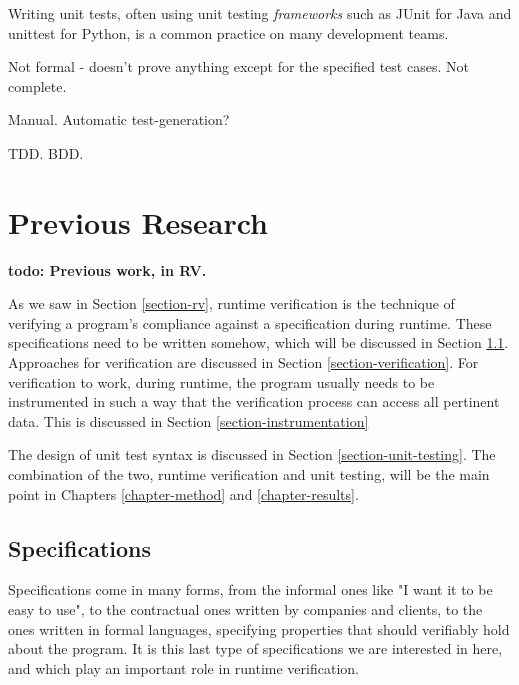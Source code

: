 \documentclass[a4paper,11pt]{kth-mag}
\newcommand{\todo}[1]{\textbf{todo: #1}}
\begin{document}
Writing unit tests, often using unit testing \textit{frameworks} such as JUnit \cite{junit}
for Java and unittest \cite{python-unittest} for Python, is a common practice on many
development teams.

Not formal - doesn't prove anything except for the specified test cases. Not complete.

Manual. Automatic test-generation?

TDD. BDD.





\pagestyle{newchap}
\chapter{Previous Research} \label{chapter-previous-research}

\todo{Previous work, in RV.}

As we saw in Section \ref{section-rv}, runtime verification is the technique of verifying a
program's compliance against a specification during runtime. These specifications need to be
written somehow, which will be discussed in Section \ref{section-specifications}. Approaches for verification
are discussed in Section \ref{section-verification}. For verification to work, during runtime, the program usually needs to be instrumented in such a way that the verification
process can access all pertinent data. This is discussed in Section \ref{section-instrumentation}

The design of unit test syntax is discussed in Section \ref{section-unit-testing}. The combination
of the two, runtime verification and unit testing, will be the main point in Chapters \ref{chapter-method} and \ref{chapter-results}.


\section{Specifications} \label{section-specifications}

Specifications come in many forms, from the informal ones like "I want it to be easy to use", to the
contractual ones written by companies and clients, to the ones written in formal languages, specifying properties that should verifiably hold about the program. It is this last type of specifications we are interested in here, and which play an important role in runtime verification.
\end{document}
